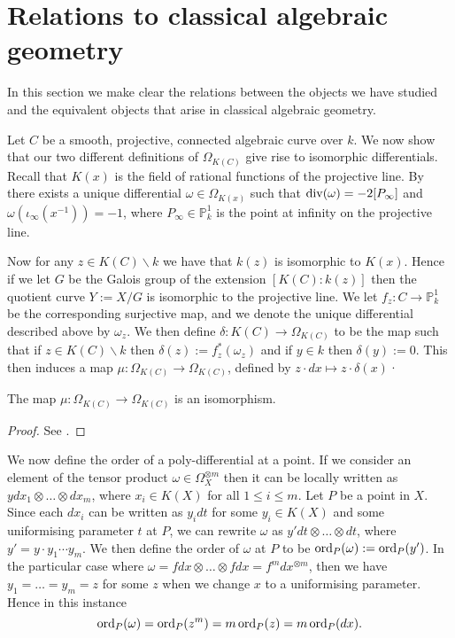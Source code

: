 \section{Relations to classical algebraic geometry}

In this section we make clear the relations between the objects we have studied and the equivalent objects that arise in classical algebraic geometry.


Let $C$ be a smooth, projective, connected algebraic curve over $k$.
We now show that our two different definitions of $\Omega_{K(C)}$ give rise to isomorphic differentials.
Recall that $K(x)$ is the field of rational functions of the projective line.
By \cite[Prop. 1.7.4]{stichtenoth} there exists a unique differential $\omega \in \Omega_{K(x)}$ such that $\operatorname{div} (\omega) = -2[P_{\infty}]$ and $\omega(\iota_\infty(x^{-1})) = -1$, where $P_\infty \in \mathbb P_k^1$ is the point at infinity on the projective line.


Now for any $z\in K(C) \backslash k$ we have that $k(z)$ is isomorphic to $K(x)$.
Hence if we let $G$ be the Galois group of the extension $[K(C):k(z)]$ then the quotient curve $Y:=X/G$ is isomorphic to the projective line.
We let $f_z\colon C \rightarrow \mathbb P_k^1$ be the corresponding surjective map, and we denote the unique differential described above by $\omega_z$.
We then define $\delta\colon K(C) \rightarrow \Omega_{K(C)}$ to be the map such that if $z\in K(C)\backslash k$ then $\delta (z) := f_z^*(\omega_z)$ and if $y\in k$ then $\delta(y):=0$.
This then induces a map $\mu\colon \Omega_{K(C)} \rightarrow \Omega_{K(C)}$, defined by $z\cdot dx \mapsto z\cdot \delta(x)$·

    \begin{thm}
    The map $\mu\colon \Omega_{K(C)} \rightarrow \Omega_{K(C)}$ is an isomorphism.
    \end{thm}
    \begin{proof}
    See \cite[Thm. 4.3.2]{stichtenoth}.
    \end{proof}

We now define the order of a poly-differential at a point.
If we consider an element of the tensor product $\omega \in \Omega_X^{\otimes m}$ then it can be locally written as $y dx_1\otimes \ldots \otimes dx_m$, where $x_i \in K(X)$ for all $1 \leq i \leq m$.
Let $P$ be a point in $X$.
Since each $dx_i$ can be written as $y_i dt$ for some $y_i\in K(X)$ and some uniformising parameter $t$ at $P$, we can rewrite $\omega$ as $y' dt \otimes \ldots \otimes dt$, where $y' = y \cdot y_1 \cdots y_m$.
We then define the order of $\omega$ at $P$ to be $\operatorname{ord}_P(\omega ) := \operatorname{ord}_P(y')$.
In the particular case where $\omega = fdx \otimes \ldots \otimes fdx = f^m dx^{\otimes m}$, then we have $y_1 = \ldots = y_m = z$ for some $z$ when we change $x$ to a uniformising parameter.
Hence in this instance 
    \[ 
    \operatorname{ord}_P(\omega) = \operatorname{ord}_P(z^m) = m\operatorname{ord}_P(z) = m\operatorname{ord}_P(dx).
    \]





